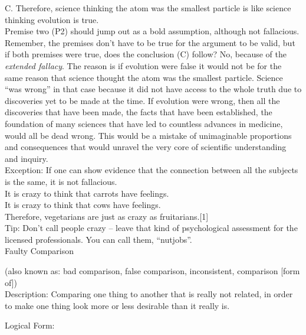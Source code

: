 \documentclass[a4paper,12pt,single,pdftex]{scrbook}
\begin{document}
    
      C. Therefore, science thinking the atom was the smallest particle is like science thinking evolution is true.
    \\

    
      Premise two (P2) should jump out as a bold assumption, although not fallacious.  Remember, the premises don’t have to be true for the argument to be valid, but if both premises were true, does the conclusion (C) follow?  No, because of the {\it extended fallacy}.  The reason is if evolution were false it would not be for the same reason that science thought the atom was the smallest particle.  Science “was wrong” in that case because it did not have access to the whole truth due to discoveries yet to be made at the time.  If evolution were wrong, then all the discoveries that have been made, the facts that have been established, the foundation of many sciences that have led to countless advances in medicine, would all be dead wrong.  This would be a mistake of unimaginable proportions and consequences that would unravel the very core of scientific understanding and inquiry.
    \\

    
      Exception: If one can show evidence that the connection between all the subjects is the same, it is not fallacious.
    \\

    
      It is crazy to think that carrots have feelings.
    \\

    
      It is crazy to think that cows have feelings.
    \\

    
      Therefore, vegetarians are just as crazy as fruitarians.[1]
    \\

    
      Tip: Don’t call people crazy -- leave that kind of psychological assessment for the licensed professionals.  You can call them, “nutjobs”.
    \\

  

Faulty Comparison
    
      (also known as: bad comparison, false comparison, inconsistent, comparison [form of])
    \\

  
    Description: Comparing one thing to another that is really not related, in order to make one thing look more or less desirable than it really is.

    
      Logical Form:
    \\
\end{document}
